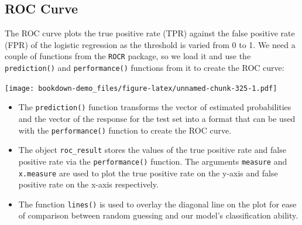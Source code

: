 \documentclass[
]{book}
\newenvironment{Shaded}{\begin{snugshade}}{\end{snugshade}}
\newcommand{\AttributeTok}[1]{\textcolor[rgb]{0.13,0.29,0.53}{#1}}
\newcommand{\DecValTok}[1]{\textcolor[rgb]{0.00,0.00,0.81}{#1}}
\newcommand{\DocumentationTok}[1]{\textcolor[rgb]{0.56,0.35,0.01}{\textbf{\textit{#1}}}}
\newcommand{\FunctionTok}[1]{\textcolor[rgb]{0.13,0.29,0.53}{\textbf{#1}}}
\newcommand{\NormalTok}[1]{#1}
\newcommand{\OtherTok}[1]{\textcolor[rgb]{0.56,0.35,0.01}{#1}}
\newcommand{\SpecialCharTok}[1]{\textcolor[rgb]{0.81,0.36,0.00}{\textbf{#1}}}
\newcommand{\StringTok}[1]{\textcolor[rgb]{0.31,0.60,0.02}{#1}}
\providecommand{\tightlist}{%
  \setlength{\itemsep}{0pt}\setlength{\parskip}{0pt}}
\begin{document}
\hypertarget{roc-curve-1}{%
\subsection*{ROC Curve}\label{roc-curve-1}}

The ROC curve plots the true positive rate (TPR) against the false positive rate (FPR) of the logistic regression as the threshold is varied from 0 to 1. We need a couple of functions from the \texttt{ROCR} package, so we load it and use the \texttt{prediction()} and \texttt{performance()} functions from it to create the ROC curve:

\begin{Shaded}
\end{Shaded}

\texttt{[image: bookdown-demo\_files/figure-latex/unnamed-chunk-325-1.pdf]}

\begin{itemize}
\tightlist
\item
  The \texttt{prediction()} function transforms the vector of estimated probabilities and the vector of the response for the test set into a format that can be used with the \texttt{performance()} function to create the ROC curve.
\item
  The object \texttt{roc\_result} stores the values of the true positive rate and false positive rate via the \texttt{performance()} function. The arguments \texttt{measure} and \texttt{x.measure} are used to plot the true positive rate on the y-axis and false positive rate on the x-axis respectively.
\item
  The function \texttt{lines()} is used to overlay the diagonal line on the plot for ease of comparison between random guessing and our model's classification ability.
\end{itemize}
\end{document}
